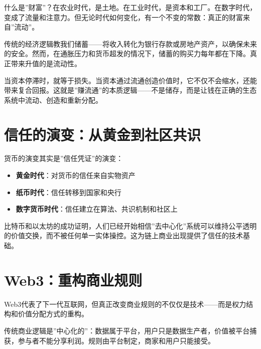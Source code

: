 \documentclass[
  Letterpaper,
]{scrbook}
\providecommand{\tightlist}{%
  \setlength{\itemsep}{0pt}\setlength{\parskip}{0pt}}
\begin{document}

什么是''财富''？在农业时代，是土地。在工业时代，是资本和工厂。在数字时代，变成了流量和注意力。但无论时代如何变化，有一个不变的常数：真正的财富来自''流动''。

传统的经济逻辑教我们储蓄------将收入转化为银行存款或房地产资产，以确保未来的安全。然而，在通胀压力和货币超发的情况下，储蓄的购买力每年都在下降。真正带来升值的是流动性。

当资本停滞时，就等于损失。当资本通过流通创造价值时，它不仅不会缩水，还能带来复合回报。这就是''赚流通''的本质逻辑------不是储存，而是让钱在正确的生态系统中流动、创造和重新分配。

\section*{信任的演变：从黄金到社区共识}\label{ux4fe1ux4efbux7684ux6f14ux53d8ux4eceux9ec4ux91d1ux5230ux793eux533aux5171ux8bc6}


货币的演变其实是''信任凭证''的演变：

\begin{itemize}
\tightlist
\item
  \textbf{黄金时代}：对货币的信任来自实物资产
\item
  \textbf{纸币时代}：信任转移到国家和央行
\item
  \textbf{数字货币时代}：信任建立在算法、共识机制和社区上
\end{itemize}

比特币和以太坊的成功证明，人们已经开始相信''去中心化''系统可以维持公平透明的价值交换，而不被任何单一实体操控。这为链上商业出现提供了信任的技术基础。

\section*{Web3：重构商业规则}\label{web3ux91cdux6784ux5546ux4e1aux89c4ux5219}


Web3代表了下一代互联网，但真正改变商业规则的不仅仅是技术------而是权力结构和价值分配方式的重构。

传统商业逻辑是''中心化的''：数据属于平台，用户只是数据生产者，价值被平台捕获，参与者不能分享利润。规则由平台制定，商家和用户只能接受。
\end{document}
